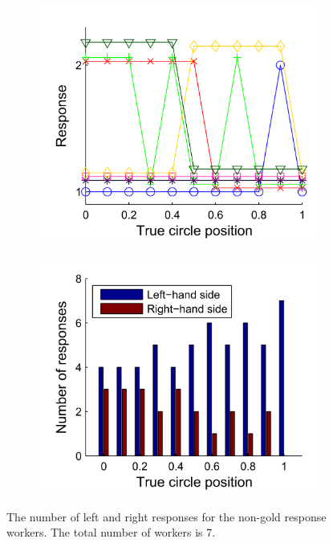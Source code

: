 \begin{figure}
	\centering
	\begin{subfigure}{7cm}
	\includegraphics[scale=1]{line_not_gold_response_curves.png}
	\caption{}	
	\label{Figure: line_not_gold_responseLR}
	\end{subfigure}
	\begin{subfigure}{7cm}
	\includegraphics[scale=1]{bar_not_gold_responsesLR.png}
	\caption{}
	\label{Figure: bar_not_goldLR}	
	\end{subfigure}
	\label{Figure: not_gold_responsesLR}
	\caption{The number of left and right responses for the non-gold response workers. The total number of workers is 7.}
\end{figure}


